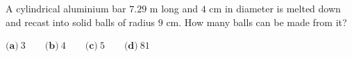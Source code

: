 A cylindrical aluminium bar $7.29$ m long and $4$ cm in diameter is melted down and recast into solid balls of radius $9$ cm. How many balls can be made from it?

$\textbf{(a)}\ 3\qquad\textbf{(b)}\ 4\qquad\textbf{(c)}\ 5\qquad\textbf{(d)}\ 81$
